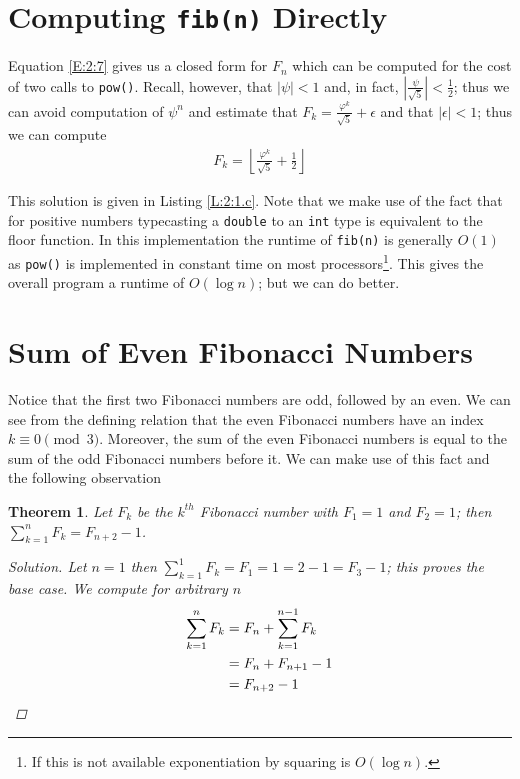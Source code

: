 \documentclass[oneside,12pt]{book}   	%
\newcounter{ex}
\newcounter{def}
\newcounter{pr}
\newtheorem{thm}{Theorem}[chapter]
\theoremstyle{definition}
\newcommand{\vaprhi}[0]{\varphi}
\newcommand{\floor}[1]{\left\lfloor #1 \right\rfloor}
\newcommand{\order}[1]{\left| #1 \right|}
\begin{document}
\begin{spacing}{1.618}
		\section{Computing \texttt{fib(n)} Directly}
		
			Equation \ref{E:2:7} gives us a closed form for $F_n$ which can be computed for the cost of two calls to \texttt{pow()}. Recall, however, that $\order{\psi}<1$ and, in fact, $\order{\frac{\psi}{\sqrt{5}}}<\frac{1}{2}$; thus we can avoid computation of $\psi^n$ and estimate that $F_k= \frac{\vaprhi^k}{\sqrt{5}}+\epsilon$ and that $\order{\epsilon}<1$; thus we can compute
			\begin{alignat}{4}
				F_k=\floor{\frac{\varphi^k}{\sqrt{5}}+\frac{1}{2}}
			\end{alignat}
			
			This solution is given in Listing \ref{L:2:1.c}. Note that we make use of the fact that for positive numbers typecasting a \texttt{double} to an \texttt{int} type is equivalent to the floor function. In this implementation the runtime of \texttt{fib(n)} is generally $O(1)$ as \texttt{pow()} is implemented in constant time on most processors\footnote{If this is not available exponentiation by squaring is $O(\log n)$.}. This gives the overall program a runtime of $O(\log n)$; but we can do better. 
		
	\section{Sum of Even Fibonacci Numbers}
	
		Notice that the first two Fibonacci numbers are odd, followed by an even. We can see from the defining relation that the even Fibonacci numbers have an index $k\equiv 0\pmod 3$. Moreover, the sum of the even Fibonacci numbers is equal to the sum of the odd Fibonacci numbers before it. We can make use of this fact and the following observation
		\begin{thm}
			Let $F_k$ be the $k^{th}$ Fibonacci number with $F_1=1$ and $F_2=1$; then $\sum_{k=1}^n F_k=F_{n+2}-1$. 
			\begin{proof}[Solution]
				Let $n=1$ then $\sum_{k=1}^1F_k=F_1=1=2-1=F_3-1$; this proves the base case. 
				We compute for arbitrary $n$
				\begin{alignat}{4}
					\sum_{k=1}^nF_k&=F_n + \sum_{k=1}^{n-1}F_k  \notag \\
						&= F_n + F_{n+1} -1 \notag \\
						&= F_{n+2}-1 \notag 
				\end{alignat}
			\end{proof}
		\end{thm}	
		

\end{spacing}
\end{document}
